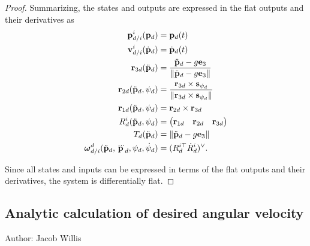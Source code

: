 \begin{proof}
Summarizing, the states and outputs are expressed in the flat outputs and their derivatives as
\begin{align*}
\mathbf{p}_{d/i}^i(\mathbf{p}_d) &= \mathbf{p}_d(t) \\
\mathbf{v}_{d/i}^i(\dot{\mathbf{p}}_d) &= \dot{\mathbf{p}}_d(t) \\
\mathbf{r}_{3d}(\ddot{\mathbf{p}}_d) &= \frac{\ddot{\mathbf{p}}_d - g \mathbf{e}_3}{\left\|\ddot{\mathbf{p}}_d - g \mathbf{e}_3\right\|} \\
\mathbf{r}_{2d}(\ddot{\mathbf{p}}_d, \psi_d) &= \frac{\mathbf{r}_{3d} \times \mathbf{s}_{\psi_d}}{\left\|\mathbf{r}_{3d} \times \mathbf{s}_{\psi_d}\right\|} \\
\mathbf{r}_{1d}(\ddot{\mathbf{p}}_d, \psi_d) &= \mathbf{r}_{2d} \times \mathbf{r}_{3d} \\
R_d^i(\ddot{\mathbf{p}}_d, \psi_d) &= \begin{pmatrix} \mathbf{r}_{1d} & \mathbf{r}_{2d} & \mathbf{r}_{3d} \end{pmatrix} \\
T_d(\ddot{\mathbf{p}}_d) &= \left\|\ddot{\mathbf{p}}_d - g \mathbf{e}_3\right\| \\	
\boldsymbol{\omega}_{d/i}^d(\ddot{\mathbf{p}}_d, \dddot{\mathbf{p}}_d, \psi_d, \dot{\psi}_d) &= (R_d^{i\top}\dot{R}_d^i)^\vee.
\end{align*}

Since all states and inputs can be expressed in terms of the flat outputs and their derivatives, the system is differentially flat.
\end{proof}

\subsection{Analytic calculation of desired angular velocity}
Author: Jacob Willis

%
%
%
%
%
%
%
%
%
%

